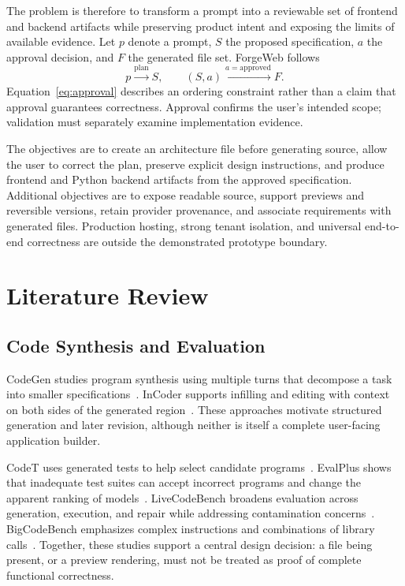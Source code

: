 \documentclass[conference,a4paper]{IEEEtran}
\begin{document}
The problem is therefore to transform a prompt into a reviewable set of frontend and backend artifacts while preserving product intent and exposing the limits of available evidence. Let $p$ denote a prompt, $S$ the proposed specification, $a$ the approval decision, and $F$ the generated file set. ForgeWeb follows
\begin{equation}
p \xrightarrow{\mathrm{plan}} S,
\qquad (S,a) \xrightarrow{a=\mathrm{approved}} F.
\label{eq:approval}
\end{equation}
Equation~\eqref{eq:approval} describes an ordering constraint rather than a claim that approval guarantees correctness. Approval confirms the user's intended scope; validation must separately examine implementation evidence.

The objectives are to create an architecture file before generating source, allow the user to correct the plan, preserve explicit design instructions, and produce frontend and Python backend artifacts from the approved specification. Additional objectives are to expose readable source, support previews and reversible versions, retain provider provenance, and associate requirements with generated files. Production hosting, strong tenant isolation, and universal end-to-end correctness are outside the demonstrated prototype boundary.

\section{Literature Review}
\subsection{Code Synthesis and Evaluation}
CodeGen studies program synthesis using multiple turns that decompose a task into smaller specifications~\cite{nijkamp2022codegen}. InCoder supports infilling and editing with context on both sides of the generated region~\cite{fried2023incoder}. These approaches motivate structured generation and later revision, although neither is itself a complete user-facing application builder.

CodeT uses generated tests to help select candidate programs~\cite{chen2022codet}. EvalPlus shows that inadequate test suites can accept incorrect programs and change the apparent ranking of models~\cite{liu2023evalplus}. LiveCodeBench broadens evaluation across generation, execution, and repair while addressing contamination concerns~\cite{jain2024livecodebench}. BigCodeBench emphasizes complex instructions and combinations of library calls~\cite{zhuo2024bigcodebench}. Together, these studies support a central design decision: a file being present, or a preview rendering, must not be treated as proof of complete functional correctness.
\end{document}
